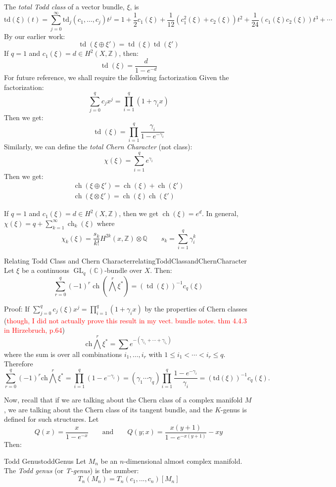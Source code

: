 \documentclass{book}
\newcommand{\C}{{\mathbb{C}}}
\newcommand{\Q}{{\mathbb{Q}}}
\newcommand{\Z}{{\mathbb{Z}}}
\newcommand{\ch}{{\operatorname{ch}}}
\newcommand{\td}{{\operatorname{td}}}
\newcommand{\GL}{{\operatorname{GL}}}
\begin{document}
The \textit{total Todd class} of a vector bundle, $\xi$, is
\[
  \text{td}(\xi)(t) = \sum_{j=0}^{\infty} \text{td}_j(c_1,\ldots,c_j)t^j = 1 + \frac{1}{2}c_1(\xi) + \frac{1}{12}(c_1^2(\xi) + c_2(\xi))t^2 + \frac{1}{24}(c_1(\xi)c_2(\xi))t^3 + \cdots
\]
By our earlier work:
\[
  \td(\xi\oplus \xi') = \td(\xi)\td(\xi')
\]
If $q= 1$ and $c_1(\xi) = d \in H^2(X, \Z)$, then:
\[
  \td(\xi) = \frac{d}{1-e^{-d}}
\]
For future reference, we shall require the following factorization Given the factorization:
\[
  \sum_{j=0}^q c_jx^j = \prod_{i=1}^q (1 + \gamma_ix)
\]
Then we get:
\[
  \td(\xi) = \prod_{i=1}^q \frac{\gamma_i}{1-e^{-\gamma_i}}
\]
Similarly, we can define the \emph{total Chern Character} (not class):
\[
  \chi(\xi) = \sum_{i=1}^q e^{\gamma_i}
\]
Then we get:
\begin{align*}
 \ch(\xi\oplus \xi') = \ch(\xi) + \ch(\xi')\\
 \ch(\xi\otimes \xi') = \ch(\xi)\ch(\xi')
\end{align*}

If $q = 1$ and $c_1(\xi) = d \in H^2(X, \Z)$, then we get $\ch(\xi) = e^d$. In general, $\chi(\xi)
= q + \sum_{k=1}^\infty \ch_k(\xi)$ where
\[
  \chi_k(\xi) = \frac{s_k}{k!} H^{2k}(x, \Z) \otimes \Q \qquad s_k = \sum_{i=1}^q \gamma_i^k
\]
\begin{thm}{Relating Todd Class and Chern Character}{relatingToddClassandChernCharacter}
  Let $\xi$ be a continuous $\GL_q(\C)$-bundle over $X$. Then:
  \[
    \sum_{r=0}^q (-1)^r \ch \left(\bigwedge^r\xi^*\right) = (\td(\xi))^{-1}c_q(\xi)
  \]
\end{thm}

\begin{Proof}
  Proof: If $\sum_{j=0}^q c_j(\xi) x^j = \prod_{i=1}^q (1 + \gamma_i x)$ by the properties of Chern classes
  (\textcolor{red}{though, I did not actually prove this result in my vect. bundle notes. thm 4.4.3 in
  Hirzebruch, p.64})
\[
    \text{ch}\bigwedge^r \xi^* = \sum e^{-(\gamma_{i_1} + \cdots + \gamma_{i_r})}
\]
where the sum is over all combinations $i_1, \ldots, i_r$ with $1 \leq i_1 < \cdots < i_r \leq q$. Therefore
\[
    \sum_{r=0}^q (-1)^r \text{ch}\bigwedge^r \xi^* = \prod_{i=1}^q (1-e^{-\gamma_i}) = (\gamma_1 \cdots \gamma_q) \prod_{i=1}^q \frac{1-e^{-\gamma_i}}{\gamma_i} = (\text{td}(\xi))^{-1} c_q(\xi).
\]
\end{Proof}

Now, recall that if we are talking about the Chern class of a complex manifold $M$, we are talking about the
Chern class of its tangent bundle, and the $K$-genus is defined for such structures. Let
\[
   Q(x) = \frac{x}{1-e^{-x}} \qquad \text{and} \qquad  Q(y;x) = \frac{x(y+1)}{1-e^{-x(y+1)}} -xy
\]
Then:
\begin{defn}{Todd Genus}{toddGenus}
  Let $M_n$ be an $n$-dimensional almost complex manifold. The \emph{Todd genus} (or \emph{T-genus}) is the number:
  \[
    T_n(M_n) = T_n(c_1, ..., c_n)[M_n]
  \]
\end{defn}
\end{document}
